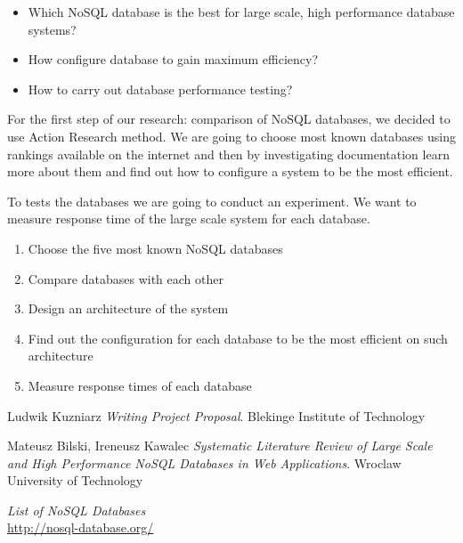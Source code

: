 \documentclass[times, 10pt,twocolumn]{article}
\newcounter{firstbib}
\begin{document}
\begin{itemize}
  \item Which NoSQL database is the best for large scale, high performance database systems?
  \item How configure database to gain maximum efficiency?
  \item How to carry out database performance testing?
\end{itemize}
 

For the first step of our research: comparison of NoSQL databases, we decided to use Action Research method.
We are going to choose most known databases using rankings available on the internet and then by investigating
documentation learn more about them and find out how to configure a system to be the most efficient.

To tests the databases we are going to conduct an experiment. We want to measure response time of the large scale
system for each database.


\begin{enumerate}
  \item Choose the five most known NoSQL databases
  \item Compare databases with each other
  \item Design an architecture of the system
  \item Find out the configuration for each database to be the most efficient on such architecture
  \item Measure response times of each database
\end{enumerate}

\begin{thebibliography}{9}  

\setcounter{enumiv}{\value{firstbib}}
      
      Ludwik Kuzniarz
      \emph{Writing Project Proposal}. Blekinge Institute of Technology
      
      Mateusz Bilski, Ireneusz Kawalec
      \emph{Systematic Literature Review of Large Scale and High Performance NoSQL Databases in Web Applications}. Wroclaw University of Technology
      
      \emph{List of NoSQL Databases} \\
      \url{http://nosql-database.org/}

\end{thebibliography}
\end{document}
